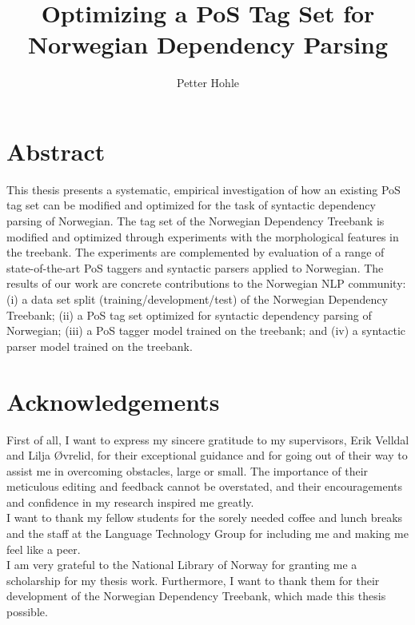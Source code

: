 \documentclass[a4paper,12pt,english]{book}
\title{Optimizing a PoS Tag Set for Norwegian Dependency Parsing}
\author{Petter Hohle}
\begin{document}
\ififorside{}

\chapter*{Abstract}
\thispagestyle{empty}
This thesis presents a systematic, empirical investigation of how an existing
PoS tag set can be modified and optimized for the task of syntactic dependency
parsing of Norwegian. The tag set of the Norwegian Dependency Treebank is
modified and optimized through experiments with the morphological features in
the treebank. The experiments are complemented by evaluation of a range of
state-of-the-art PoS taggers and syntactic parsers applied to Norwegian. The
results of our work are concrete contributions to the Norwegian NLP community:
(i) a data set split (training/development/test) of the Norwegian Dependency
Treebank; (ii) a PoS tag set optimized for syntactic dependency parsing of
Norwegian; (iii) a PoS tagger model trained on the treebank; and (iv) a
syntactic parser model trained on the treebank.

\chapter*{Acknowledgements}
\thispagestyle{empty}
First of all, I want to express my sincere gratitude to my supervisors, Erik
Velldal and Lilja Øvrelid, for their exceptional guidance and for going out of
their way to assist me in overcoming obstacles, large or small. The importance
of their meticulous editing and feedback cannot be overstated, and their
encouragements and confidence in my research inspired me greatly.
\\

I want to thank my fellow students for the sorely needed coffee and lunch
breaks and the staff at the Language Technology Group for including me and
making me feel like a peer.
\\

I am very grateful to the National Library of Norway for granting me a
scholarship for my thesis work. Furthermore, I want to thank them for their
development of the Norwegian Dependency Treebank, which made this thesis
possible.
\\
\end{document}
